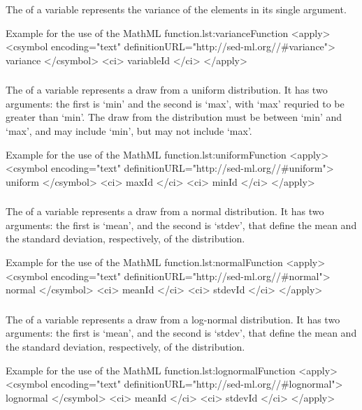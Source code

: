 \begin{blockChanged}
\subsubsection*{}
\label{fun:variance}
The \variance of a variable represents the variance of the elements in its single argument.
\begin{myXmlLst}{Example for the use of the MathML  function.}{lst:varianceFunction}
<apply>
 	<csymbol encoding="text" definitionURL="http://sed-ml.org//#variance">
 		variance
 	</csymbol>
 	<ci> variableId </ci>
</apply>
\end{myXmlLst}


\subsubsection*{}
\label{fun:uniform}
The \uniform of a variable represents a draw from a uniform distribution.  It has two arguments:  the first is `min' and the second is `max', with `max' requried to be greater than `min'.  The draw from the distribution must be between `min' and `max', and may include `min', but may not include `max'.
\begin{myXmlLst}{Example for the use of the MathML  function.}{lst:uniformFunction}
<apply>
 	<csymbol encoding="text" definitionURL="http://sed-ml.org//#uniform">
 		uniform
 	</csymbol>
 	<ci> maxId </ci>
 	<ci> minId </ci>
</apply>
\end{myXmlLst}


\subsubsection*{}
\label{fun:normal}
The \normal of a variable represents a draw from a normal distribution.  It has two arguments:  the first is `mean', and the second is `stdev', that define the mean and the standard deviation, respectively, of the distribution.
\begin{myXmlLst}{Example for the use of the MathML  function.}{lst:normalFunction}
<apply>
 	<csymbol encoding="text" definitionURL="http://sed-ml.org//#normal">
 		normal
 	</csymbol>
 	<ci> meanId </ci>
 	<ci> stdevId </ci>
</apply>
\end{myXmlLst}


\subsubsection*{}
\label{fun:lognormal}
The \lognormal of a variable represents a draw from a log-normal distribution.  It has two arguments:  the first is `mean', and the second is `stdev', that define the mean and the standard deviation, respectively, of the distribution.
\begin{myXmlLst}{Example for the use of the MathML  function.}{lst:lognormalFunction}
<apply>
 	<csymbol encoding="text" definitionURL="http://sed-ml.org//#lognormal">
 		lognormal
 	</csymbol>
 	<ci> meanId </ci>
 	<ci> stdevId </ci>
</apply>
\end{myXmlLst}



\end{blockChanged}
